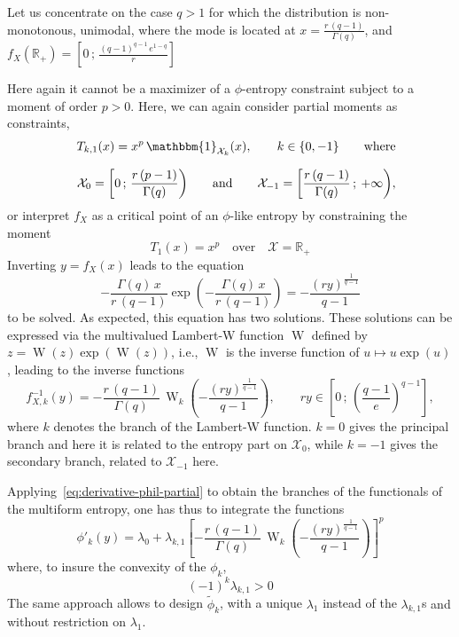 \documentclass[entropy,article,submit,moreauthors,pdftex]{Definitions/mdpi}
\newcommand{\SZ}[1]{{\color{blue} #1}}                                       %
\def\Rset{\mathbb{R}}%
\def\X{\mathcal{X}}%
\def\un{\mathbbm{1}}%
\def\W{\operatorname{W}} %
\begin{document}
Let  us  concentrate  on  the  case  $q >  1$  for  which  the  distribution  is
non-monotonous,  unimodal, where  the  mode is  located at  \SZ{$x  = \frac{r  \,
    (q-1)}{\Gamma(q)}$, and $f_X(\Rset_+)  = \left[ 0 \,  ; \, \frac{(q-1)^{q-1}
      \, e^{1-q}}{r} \right]$ }

Here again it cannot be \SZ{a  maximizer of a $\phi$-entropy constraint subject
  to  a moment  of order  $p >  0$}.  Here,  we can  again \SZ{consider  partial
  moments as constraints,
  \SZ{
\begin{eqnarray*}
&&  T_{k,1}(x) =  x^p  \,  \un_{\X_k}(x), \qquad  k  \in \{  0  ,  -1 \}  \qquad
  \mbox{where} \\[2.5mm] && \X_0 = \left[ 0 \, ; \, \frac{r \, (p-1)}{\Gamma(q)}
    \right)   \qquad   \mbox{and}   \qquad   \X_{-1}   =   \left[   \frac{r   \,
        (q-1)}{\Gamma(q)} \, ; \: +\infty \right),
\end{eqnarray*}
%
}
or interpret $f_X$ as a critical point of an $\phi$-like entropy by constraining} the moment 
%
\[
T_1(x) = x^p \quad \mbox{over} \quad \X = \Rset_+
\]
%
Inverting $y = f_X(x)$ leads to the equation
%
\SZ{
\[
- \frac{\Gamma(q) \, x}{r \, (q-1)}  \exp\left( -  \frac{\Gamma(q) \, x}{r \, (q-1)}  \right) =  -
       \frac{\left( r y \right)^{\frac{1}{q-1}}}{q-1}
\]
}
%
to be solved. As expected, this  equation has two solutions. These solutions can
be  expressed   via  the   multivalued  Lambert-W   function  $\W$   defined  by
$z=\W(z)\exp(\W(z))$,  i.e., $\W$  is  the  inverse function  of  $u \mapsto  u
\exp(u)$\cite[\S~1]{CorGon96}, leading to the inverse functions
%
\SZ{
\[
f_{X,k}^{-1}(y) = - \frac{r \,  (q-1)}{\Gamma(q)} \, \W_k\left( - \frac{\left( r
  y \right)^{\frac{1}{q-1}}}{q-1}  \right) ,  \qquad r  y \in \left[  0 \,  ; \,
  \left( \frac{q-1}{e} \right)^{q-1} \right],
\]
}
%
where  $k$  denotes the  branch  of  the  Lambert-W  function. $k=0$  gives  the
principal branch and here it is related  to the entropy part on $\X_0$, while $k
= -1$ gives the secondary branch, related to $\X_{-1}$ here.

\SZ{Applying~\eqref{eq:derivative-phil-partial}  to  obtain  the branches  of  the
  functionals  of the  multiform entropy,  one}  has thus  to \SZ{integrate  the
  functions}
%
\[
\phi'_k(y) = \lambda_0 + \lambda_{k,1}  \left[ - \frac{r \, (q-1)}{\Gamma(q)} \,
  \W_k\left( - \frac{\left( r y \right)^{\frac{1}{q-1}}}{q-1} \right) \right]^p
\]
%
where, to insure the convexity of the $\phi_k$,
%
\[
(-1)^k \lambda_{k,1} > 0
\]
%
The  same  approach  allows  to   design  $\widetilde{\phi}_k$,  with  a  unique
$\lambda_1$  instead  of the  $\lambda_{k,1}$s  \SZ{and  without restriction  on
  $\lambda_1$}.
\end{document}
